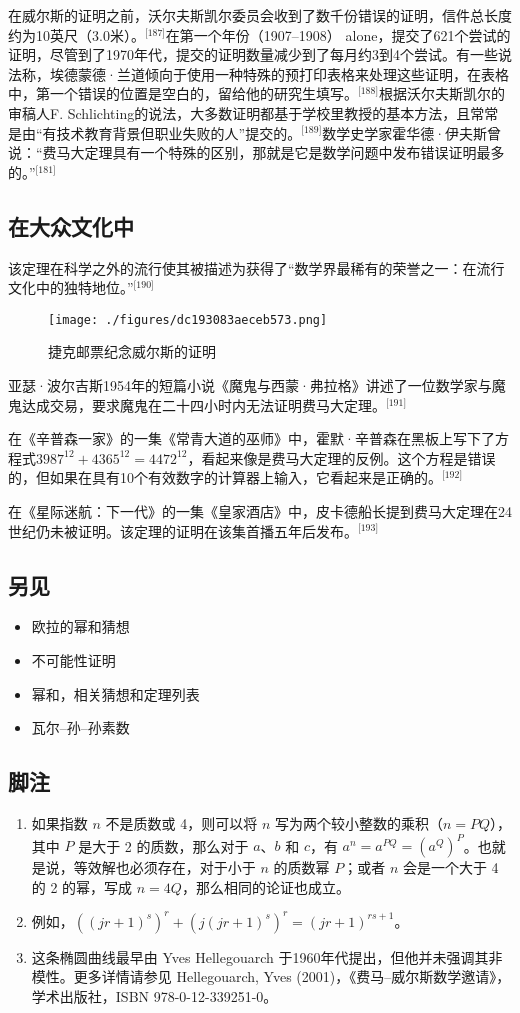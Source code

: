 在威尔斯的证明之前，沃尔夫斯凯尔委员会收到了数千份错误的证明，信件总长度约为10英尺（3.0米）。\(^\text{[187]}\)在第一个年份（1907–1908） alone，提交了621个尝试的证明，尽管到了1970年代，提交的证明数量减少到了每月约3到4个尝试。有一些说法称，埃德蒙德·兰道倾向于使用一种特殊的预打印表格来处理这些证明，在表格中，第一个错误的位置是空白的，留给他的研究生填写。\(^\text{[188]}\)根据沃尔夫斯凯尔的审稿人F. Schlichting的说法，大多数证明都基于学校里教授的基本方法，且常常是由“有技术教育背景但职业失败的人”提交的。\(^\text{[189]}\)数学史学家霍华德·伊夫斯曾说：“费马大定理具有一个特殊的区别，那就是它是数学问题中发布错误证明最多的。”\(^\text{[181]}\)
\subsection{在大众文化中}
该定理在科学之外的流行使其被描述为获得了“数学界最稀有的荣誉之一：在流行文化中的独特地位。”\(^\text{[190]}\)
\begin{figure}[ht]
\centering
\texttt{[image: ./figures/dc193083aeceb573.png]}
\caption{捷克邮票纪念威尔斯的证明} \label{fig_FMDL_3}
\end{figure}
亚瑟·波尔吉斯1954年的短篇小说《魔鬼与西蒙·弗拉格》讲述了一位数学家与魔鬼达成交易，要求魔鬼在二十四小时内无法证明费马大定理。\(^\text{[191]}\)

在《辛普森一家》的一集《常青大道的巫师》中，霍默·辛普森在黑板上写下了方程式\( 3987^{12} + 4365^{12} = 4472^{12} \)，看起来像是费马大定理的反例。这个方程是错误的，但如果在具有10个有效数字的计算器上输入，它看起来是正确的。\(^\text{[192]}\)

在《星际迷航：下一代》的一集《皇家酒店》中，皮卡德船长提到费马大定理在24世纪仍未被证明。该定理的证明在该集首播五年后发布。\(^\text{[193]}\)
\subsection{另见}
\begin{itemize}
\item 欧拉的幂和猜想  
\item 不可能性证明  
\item 幂和，相关猜想和定理列表  
\item 瓦尔–孙–孙素数
\end{itemize}
\subsection{脚注}  
\begin{enumerate}
\item 如果指数 \( n \) 不是质数或 4，则可以将 \( n \) 写为两个较小整数的乘积（\( n = PQ \)），其中 \( P \) 是大于 2 的质数，那么对于 \( a \)、\( b \) 和 \( c \)，有 \( a^n = a^{PQ} = (a^Q)^P \)。也就是说，等效解也必须存在，对于小于 \( n \) 的质数幂 \( P \)；或者 \( n \) 会是一个大于 4 的 2 的幂，写成 \( n = 4Q \)，那么相同的论证也成立。  
\item 例如，\(((jr + 1)^s)^r + (j(jr + 1)^s)^r = (jr + 1)^{rs+1}\)。  
\item 这条椭圆曲线最早由 Yves Hellegouarch 于1960年代提出，但他并未强调其非模性。更多详情请参见 Hellegouarch, Yves (2001)，《费马–威尔斯数学邀请》，学术出版社，ISBN 978-0-12-339251-0。
\end{enumerate}
